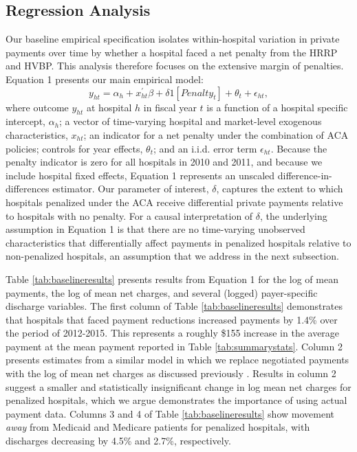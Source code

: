 \documentclass[12pt]{article}
\begin{document}
\subsection{Regression Analysis}
Our baseline empirical specification isolates within-hospital variation in private payments over time by whether a hospital faced a net penalty from the HRRP and HVBP. This analysis therefore focuses on the extensive margin of penalties.  Equation 1 presents our main empirical model:
\begin{equation}
\label{eq: reg}
y_{ht} = \alpha_{h} + x^{'}_{ht}\beta + \delta1[Penalty_{t}]  + \theta_{t}  +  \epsilon_{ht},
\end{equation}
where outcome $y_{ht}$ at hospital $h$ in fiscal year $t$ is a function of a hospital specific intercept, $\alpha_{h}$; a vector of time-varying hospital and market-level exogenous characteristics, $x_{ht}$; an indicator for a net penalty under the combination of ACA policies; controls for year effects, $\theta_t$; and an i.i.d. error term $\epsilon_{ht}$.  Because the penalty indicator is zero for all hospitals in 2010 and 2011, and because we include hospital fixed effects, Equation 1 represents an unscaled difference-in-differences estimator. Our parameter of interest, $\delta$, captures the extent to which hospitals penalized under the ACA receive differential private payments relative to hospitals with no penalty.  For a causal interpretation of $\delta$, the underlying assumption in Equation 1 is that there are no time-varying unobserved characteristics that differentially affect payments in penalized hospitals relative to non-penalized hospitals, an assumption that we address in the next subsection.

Table \ref{tab:baselineresults} presents results from Equation 1 for the log of mean payments, the log of mean net charges, and several (logged) payer-specific discharge variables. The first column of Table \ref{tab:baselineresults} demonstrates that hospitals that faced payment reductions increased payments by 1.4\% over the period of 2012-2015.  This represents a roughly \$155 increase in the average payment at the mean payment reported in Table \ref{tab:summarystats}.  Column 2 presents estimates from a similar model in which we replace negotiated payments with the log of mean net charges as discussed previously \citep{dafny2009,lewis2015,schmitt2017,dranove2017}. Results in column 2 suggest a smaller and statistically insignificant change in log mean net charges for penalized hospitals, which we argue demonstrates the importance of using actual payment data.  Columns 3 and 4 of Table \ref{tab:baselineresults} show movement \textit{away} from Medicaid and Medicare patients for penalized hospitals, with discharges decreasing by 4.5\% and 2.7\%, respectively.
\end{document}
